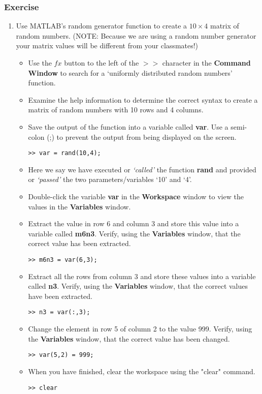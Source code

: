 \documentclass[12pt,a4paper]{article}
\begin{document}
		
\subsubsection*{Exercise}
\begin{enumerate}
	\item Use MATLAB's random generator function to create a $10\times4$ matrix of random numbers. (NOTE: Because we are using a random number generator your matrix values will be different from your classmates!)
    	\begin{itemize}
    		\item Use the $fx$ button to the left of the $>>$ character in the \textbf{Command Window} to search for a `uniformly distributed random numbers' function.
    		\item Examine the help information to determine the correct syntax to create a matrix of random numbers with 10 rows and 4 columns.		
    		\item Save the output of the function into a variable called \textbf{var}.  Use a semi-colon (;) to prevent the output from being displayed on the screen.
    		\begin{lstlisting}[style=Matlab-editor]
    >> var = rand(10,4);
    		\end{lstlisting}	
    		\item Here we say we have executed or \emph{`called'} the function \textbf{rand} and provided or \emph{`passed'} the two parameters/variables `10'  and `4'.
    		\item Double-click the variable \textbf{var} in the \textbf{Workspace} window to view the values in the \textbf{Variables} window.
    		\item Extract the value in row 6 and column 3 and store this value into a variable called \textbf{m6n3}.  Verify, using the \textbf{Variables} window, that the correct value has been extracted.
    		\begin{lstlisting}[style=Matlab-editor]
    >> m6n3 = var(6,3);
    		\end{lstlisting}
    		\item Extract all the rows from column 3 and store these values into a variable called \textbf{n3}.  Verify, using the \textbf{Variables} window, that the correct values have been extracted.
    		\begin{lstlisting}[style=Matlab-editor]
    >> n3 = var(:,3);
    		\end{lstlisting}	
    		\item Change the element in row 5 of column 2 to the value 999.  Verify, using the \textbf{Variables} window, that the correct value has been changed.
    		\begin{lstlisting}[style=Matlab-editor]
    >> var(5,2) = 999;
    		\end{lstlisting}	
    		\item When you have finished, clear the workspace using the "clear" command.
    		\begin{lstlisting}[style=Matlab-editor]
    >> clear
    
    		\end{lstlisting}	
    	\end{itemize}
\end{enumerate}
\end{document}
